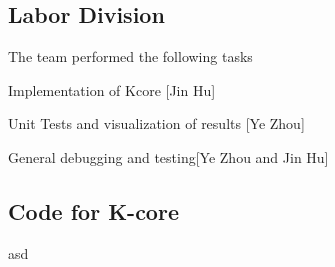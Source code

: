 
\subsection{Labor Division}

The team performed the following tasks
\bit
\item Implementation of Kcore [Jin Hu]
\item Unit Tests and visualization of results [Ye Zhou]
\item General debugging and testing[Ye Zhou and Jin Hu]
\eit

\subsection{Code for K-core}
asd